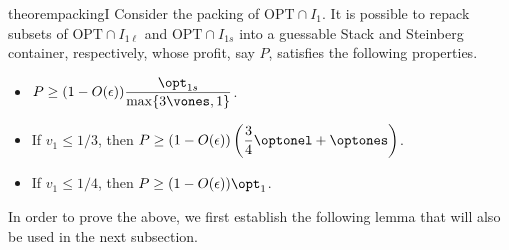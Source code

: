 \begin{restatable}{theorem}{packingI}
\label{thm:packingI1}
    Consider the packing of $\text{OPT}\cap I_1$. It is possible to repack subsets of $\text{OPT}\cap I_{1\ell}$ and $\text{OPT}\cap I_{1s}$ into a guessable Stack and Steinberg container, respectively, whose profit, say $P$, satisfies the following properties.
    \begin{itemize}
        \item $\displaystyle P \ge (1-O(\epsilon))\frac{\opt_{1s}}{\max\{3\vones, 1\}}$.
        \item If $v_1\le 1/3$, then $\displaystyle P  \ge (1-O(\epsilon))\left(\frac{3}{4}\optonel+\optones\right)$.
        \item If $v_1 \le 1/4$, then $P\ge (1-O(\epsilon))\opt_1$.
    \end{itemize}
    
\end{restatable}

In order to prove the above, we first establish the following lemma that will also be used in the next subsection.


